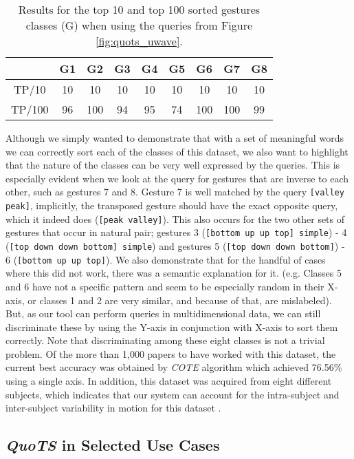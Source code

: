 \begin{table}
\centering
\begin{tabular}{ccccccccc}
\toprule[1.5pt]
& G1 & G2 & G3 & G4 & G5 & G6 & G7 & G8\\
\midrule
TP/10 & 10 & 10 & 10 & 10 & 10 & 10 & 10 & 10\\
TP/100 & 96 & 100 & 94 & 95 & 74 & 100 & 100 & 99\\
\bottomrule[1.5pt]
\end{tabular}
\caption{Results for the top 10 and top 100 sorted gestures classes  (G) when using the queries from Figure \ref{fig:quots_uwave}.}
\label{tab:quots_exp1}
\end{table}

Although we simply wanted to demonstrate that with a set of meaningful words we can correctly sort each of the classes of this dataset, we also want to highlight that the nature of the classes can be very well expressed by the queries. This is especially evident when we look at the query for gestures that are inverse to each other, such as gestures 7 and 8. Gesture 7 is well matched by the query \texttt{[valley peak]}, implicitly, the transposed gesture should have the exact opposite query, which it indeed does (\texttt{[peak valley]}). This also occurs for the two other sets of gestures that occur in natural pair; gestures 3 (\texttt{[bottom up up top] simple}) - 4 (\texttt{[top down down bottom] simple}) and gestures  5 (\texttt{[top down down bottom]}) - 6 (\texttt{[bottom up up top]}).
We also demonstrate that for the handful of cases where this did not work, there was a semantic explanation for it. (e.g. Classes 5 and 6 have not a specific pattern and seem to be especially random in their X-axis, or classes 1 and 2 are very similar, and because of that, are mislabeled). But, as our tool can perform queries in multidimensional data, we can still discriminate these by using the Y-axis in conjunction with X-axis to sort them correctly. 
Note that discriminating among these eight classes is not a trivial problem. Of the more than 1,000 papers to have worked with this dataset, the current best accuracy was obtained by \textit{COTE} algorithm which achieved 76.56\% using a single axis. In addition, this dataset was acquired from eight different subjects, which indicates that our system can account for the intra-subject and inter-subject variability in motion for this dataset \cite{uWave}.

\subsection{\textit{QuoTS} in Selected Use Cases}

